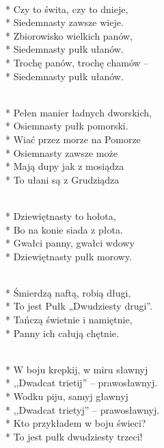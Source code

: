 \begin{lyrics}[longestline={\intertitle{1. Pułk Szwoleżerów J. Piłsudskiego}}]
\\*
\smallskip
Czy to świta, czy to dnieje,\\*
Siedemnasty zawsze wieje.\\*
\medskip
Zbiorowisko wielkich panów,\\*
Siedemnasty pułk ułanów.\\*
\medskip
Trochę panów, trochę chamów –\\*
Siedemnasty pułk ułanów.

\\*
\smallskip
Pełen manier ładnych dworskich,\\*
Osiemnasty pułk pomorski.\\*
\medskip
Wiać przez morze na Pomorze\\*
Osiemnasty zawsze może\\*
\medskip
Mają dupy jak z mosiądza\\*
To ułani są z Grudziądza

\\*
\smallskip
Dziewiętnasty to hołota,\\*
Bo na konie siada z płota.\\*
\medskip
Gwałci panny, gwałci wdowy\\*
Dziewiętnasty pułk morowy.

\\*
\smallskip
Śmierdzą naftą, robią długi,\\*
To jest Pułk „Dwudziesty drugi”.\\*
\medskip
Tańczą świetnie i namiętnie,\\*
Panny ich całują chętnie.

\\*
\smallskip
W boju krepkij, w miru sławnyj\\*
,,Dwadcat trietij'' – prawosławnyj.\\*
\medskip
Wodku piju, samyj gławnyj\\*
,,Dwadcat trietyj'' – prawosławnyj.\\*
\medskip
Kto przykładem w boju świeci?\\*
To jest pułk dwudziesty trzeci!
\end{lyrics}



